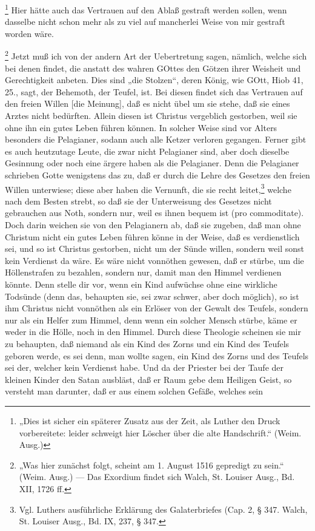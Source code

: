\footnote{„Dies ist sicher ein späterer Zusatz aus der Zeit, als Luther den Druck vorbereitete: leider schweigt hier Löscher über die alte Handschrift.“ (Weim. Ausg.)} Hier hätte auch das Vertrauen auf den Ablaß gestraft werden sollen, wenn dasselbe nicht schon mehr als zu viel auf mancherlei Weise von mir gestraft worden wäre.

\footnote{„Was hier zunächst folgt, scheint am 1. August 1516 gepredigt zu sein.“ (Weim. Ausg.) — Das Exordium findet sich Walch, St. Louiser Ausg., Bd. XII, 1726 ff.} Jetzt muß ich von der andern Art der Uebertretung sagen, nämlich, welche sich bei denen findet, die anstatt des wahren GOttes den Götzen ihrer Weisheit und Gerechtigkeit anbeten. Dies sind „die Stolzen“, deren König, wie GOtt, Hiob 41, 25., sagt, der Behemoth, der Teufel, ist. Bei diesen findet sich das Vertrauen auf den freien Willen [die Meinung], daß es nicht übel um sie stehe, daß sie eines Arztes nicht bedürften. Allein diesen ist Christus vergeblich gestorben, weil sie ohne ihn ein gutes Leben führen können. In solcher Weise sind vor Alters besonders die Pelagianer, sodann auch alle Ketzer verloren gegangen. Ferner gibt es auch heutzutage Leute, die zwar nicht Pelagianer sind, aber doch dieselbe Gesinnung oder noch eine ärgere haben als die Pelagianer. Denn die Pelagianer schrieben Gotte wenigstens das zu, daß er durch die Lehre des Gesetzes den freien Willen unterwiese; diese aber haben die Vernunft, die sie recht leitet,\footnote{Vgl. Luthers ausführliche Erklärung des Galaterbriefes (Cap. 2, § 347. Walch, St. Louiser Ausg., Bd. IX, 237, § 347.} welche nach dem Besten strebt, so daß sie der Unterweisung des Gesetzes nicht gebrauchen aus Noth, sondern nur, weil es ihnen bequem ist (pro commoditate). Doch darin weichen sie von den Pelagianern ab, daß sie zugeben, daß man ohne Christum nicht ein gutes Leben führen könne in der Weise, daß es verdienstlich sei, und so ist Christus gestorben, nicht um der Sünde willen, sondern weil sonst kein Verdienst da wäre. Es wäre nicht vonnöthen gewesen, daß er stürbe, um die Höllenstrafen zu bezahlen, sondern nur, damit man den Himmel verdienen könnte. Denn stelle dir vor, wenn ein Kind aufwüchse ohne eine wirkliche Todsünde (denn das, behaupten sie, sei zwar schwer, aber doch möglich), so ist ihm Christus nicht vonnöthen als ein Erlöser von der Gewalt des Teufels, sondern nur als ein Helfer zum Himmel, denn wenn ein solcher Mensch stürbe, käme er weder in die Hölle, noch in den Himmel. Durch diese Theologie scheinen sie mir zu behaupten, daß niemand als ein Kind des Zorns und ein Kind des Teufels geboren werde, es sei denn, man wollte sagen, ein Kind des Zorns und des Teufels sei der, welcher kein Verdienst habe. Und da der Priester bei der Taufe der kleinen Kinder den Satan ausbläst, daß er Raum gebe dem Heiligen Geist, so versteht man darunter, daß er aus einem solchen Gefäße, welches sein

